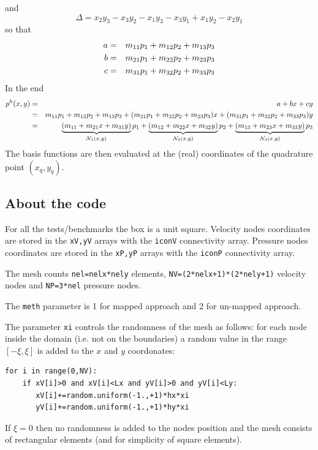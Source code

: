 and
\[
\Delta = x_2y_3-x_3y_2 - x_1y_3-x_3y_1 + x_1y_2-x_2y_1
\]
so that
\begin{eqnarray}
a &=& m_{11}p_1 + m_{12} p_2 + m_{13} p_3 \nonumber\\
b &=& m_{21}p_1 + m_{22} p_2 + m_{23} p_3 \nonumber\\
c &=& m_{31}p_1 + m_{32} p_2 + m_{33} p_3 \nonumber
\end{eqnarray}
In the end 
\begin{eqnarray}
p^h(x,y) 
&=&  a+bx+cy \nonumber\\
&=& m_{11}p_1 + m_{12} p_2 + m_{13} p_3
+ (m_{21}p_1 + m_{22} p_2 + m_{23} p_3) x
+ (m_{31}p_1 + m_{32} p_2 + m_{33} p_3) y \nonumber\\
&=& \underbrace{(m_{11} + m_{21}x + m_{31}y)}_{{\mathcal{N}}_1(x,y)} p_1 
+   \underbrace{(m_{12} + m_{22}x + m_{32}y)}_{{\mathcal{N}}_2(x,y)} p_2 
+   \underbrace{(m_{13} + m_{23}x + m_{33}y)}_{{\mathcal{N}}_3(x,y)} p_3
\end{eqnarray}
The basis functions are then evaluated at the (real) coordinates 
of the quadrature point $(x_q,y_q)$.



\subsection*{About the code}

For all the tests/benchmarks the box is a unit square.
Velocity nodes coordinates are stored in the \lstinline{xV,yV} arrays
with the \lstinline{iconV} connectivity array.
Pressure nodes coordinates are stored in the \lstinline{xP,yP} arrays
with the \lstinline{iconP} connectivity array.

The mesh counts \lstinline{nel=nelx*nely} elements,
\lstinline{NV=(2*nelx+1)*(2*nely+1)} velocity nodes and 
\lstinline{NP=3*nel} pressure nodes.

The \lstinline{meth} parameter is 1 for mapped approach and 2 
for un-mapped approach. 

The parameter \lstinline{xi} controls the randomness of the mesh as follows:
for each node inside the domain (i.e. not on the boundaries) a random value 
in the range $[-\xi,\xi]$ is added to the $x$ and $y$ coordonates:
\begin{lstlisting}
for i in range(0,NV):
    if xV[i]>0 and xV[i]<Lx and yV[i]>0 and yV[i]<Ly:
       xV[i]+=random.uniform(-1.,+1)*hx*xi
       yV[i]+=random.uniform(-1.,+1)*hy*xi
\end{lstlisting}
If $\xi=0$ then no randomness is added to the nodes position and the 
mesh consists of rectangular elements (and for simplicity of square elements).

